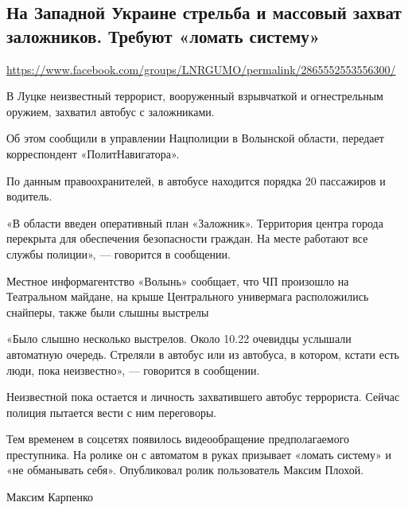  
 
\subsection{На Западной Украине стрельба и массовый захват заложников. Требуют «ломать систему»}
\label{sec:21_07_2020.fb.lnr.6}
\url{https://www.facebook.com/groups/LNRGUMO/permalink/2865552553556300/}
  

В Луцке неизвестный террорист, вооруженный взрывчаткой и огнестрельным оружием,
захватил автобус с заложниками.

Об этом сообщили в управлении Нацполиции в Волынской области, передает
корреспондент «ПолитНавигатора».

По данным правоохранителей, в автобусе находится порядка 20 пассажиров и
водитель.

«В области введен оперативный план «Заложник». Территория центра города
перекрыта для обеспечения безопасности граждан. На месте работают все службы
полиции», --- говорится в сообщении.

Местное информагентство «Волынь» сообщает, что ЧП произошло на Театральном
майдане, на крыше Центрального универмага расположились снайперы, также были
слышны выстрелы

«Было слышно несколько выстрелов. Около 10.22 очевидцы услышали автоматную
очередь. Стреляли в автобус или из автобуса, в котором, кстати есть люди, пока
неизвестно», --- говорится в сообщении.

Неизвестной пока остается и личность захватившего автобус террориста. Сейчас
полиция пытается вести с ним переговоры.

Тем временем в соцсетях появилось видеообращение предполагаемого преступника.
На ролике он с автоматом в руках призывает «ломать систему» и «не обманывать
себя». Опубликовал ролик пользователь Максим Плохой.

Максим Карпенко
  
